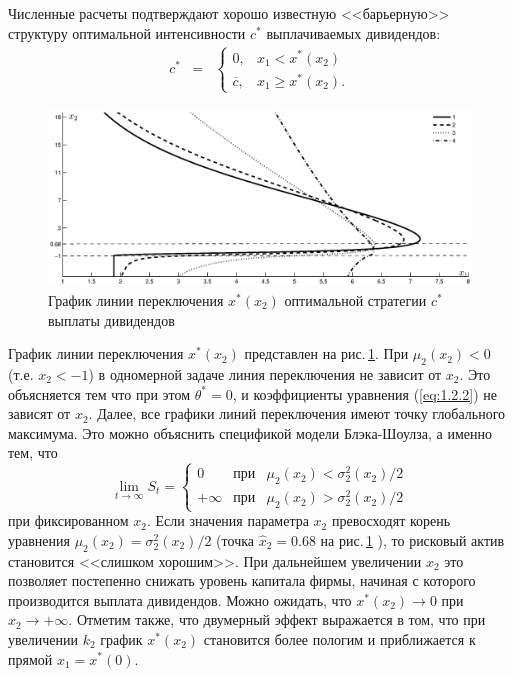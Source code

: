 \documentclass[twoside,12pt]{article}
\begin{document}
Численные расчеты подтверждают хорошо известную <<барьерную>> структуру оптимальной интенсивности $c^*$ выплачиваемых дивидендов:
\begin{equation}
 \begin{matrix}
c^* & = & \left \{
\begin{matrix} 0,& x_1< x^*(x_2) \\
               \overline c,& x_1 \ge x^*(x_2).
\end{matrix}\right.
\end{matrix}
\end{equation}
\begin{figure}[h]
        \centering
          \includegraphics[width=1.1\textwidth]{images/C_1_f}
         \caption{График линии переключения $x^*(x_2)$ оптимальной стратегии $c^*$ выплаты дивидендов}
          \label{fig:1.2}
\end{figure}

График линии переключения $x^*(x_2)$ представлен на рис.\,\ref{fig:1.2}. При $\mu_2(x_2)<0$ (т.е. $x_2<-1$) в одномерной задаче линия переключения не зависит от $x_2$. Это объясняется тем что при этом $\theta^*=0$, и коэффициенты уравнения  (\ref{eq:1.2.2}) не зависят от $x_2$. Далее, все графики линий переключения имеют точку глобального максимума.
Это можно объяснить спецификой модели Блэка-Шоулза, а именно тем, что
$$ \lim_{t\to\infty} S_t=\left\{\begin{matrix}
  0 &\text{при}& \mu_2(x_2)<\sigma_2^2(x_2)/2\\
  +\infty&\text{при}& \mu_2(x_2)>\sigma_2^2(x_2)/2
 \end{matrix}\right.
$$
при фиксированном $x_2$. Если значения параметра $x_2$ превосходят корень уравнения $\mu_2(x_2)=\sigma_2^2(x_2)/2$ (точка $\widehat x_2=0.68$ на рис.\,\ref{fig:1.2} ), то рисковый актив становится <<слишком хорошим>>. При дальнейшем увеличении $x_2$ это позволяет постепенно снижать уровень капитала фирмы, начиная с которого производится выплата дивидендов. Можно ожидать, что $x^*(x_2)\to 0$ при $x_2 \to +\infty$. Отметим также, что двумерный эффект выражается в том, что при увеличении $k_2$ график $x^*(x_2)$ становится более пологим и приближается к прямой $x_1=x^*(0)$.
\end{document}
